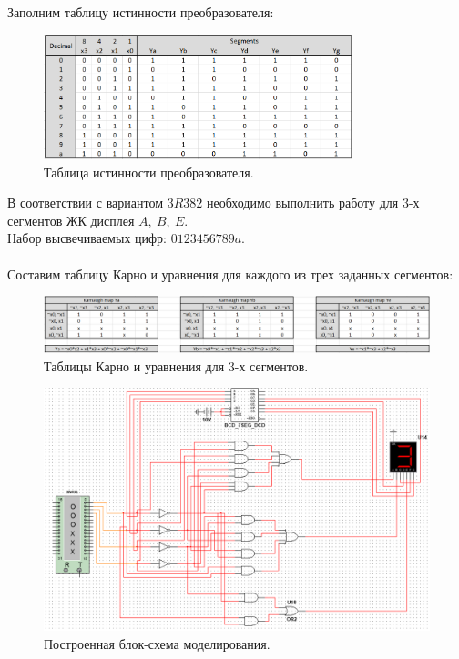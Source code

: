 \documentclass[12pt]{article}
\begin{document}
Заполним таблицу истинности преобразователя:
\begin{figure}[H]
    \centering
    \includegraphics[width=0.8\textwidth]{true_table.png}
    \caption{Таблица истинности преобразователя.}
    \label{fig:true_table}
\end{figure}

В соответствии с вариантом $3R382$ необходимо выполнить работу для 3-х сегментов ЖК дисплея $A, \ B, \ E$. \\
Набор высвечиваемых цифр: $0123456789a$. \\
\ \\

Составим таблицу Карно и уравнения для каждого из трех заданных сегментов:
\begin{figure}[H]
    \centering
    \includegraphics[width=\textwidth]{kar_maps.png}
    \caption{Таблицы Карно и уравнения для 3-х сегментов.}
    \label{fig:kar_maps}
\end{figure}

\begin{figure}[H]
    \centering
    \includegraphics[width=\textwidth]{scheme_sim.png}
    \caption{Построенная блок-схема моделирования.}
    \label{fig:scheme_sim}
\end{figure}
\end{document}
